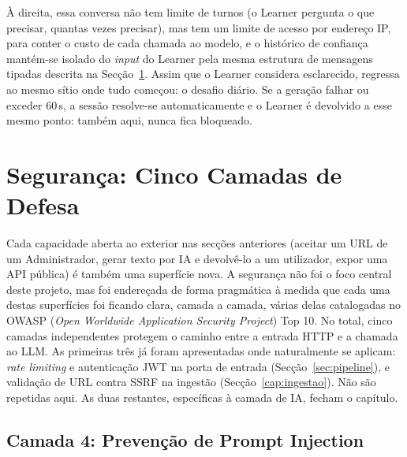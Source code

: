 À direita, essa conversa não tem limite de turnos (o Learner pergunta o que precisar, quantas vezes precisar), mas tem um limite de acesso por endereço IP, para conter o custo de cada chamada ao modelo, e o histórico de confiança mantém-se isolado do \textit{input} do Learner pela mesma estrutura de mensagens tipadas descrita na Secção~\ref{sec:seguranca-impl}. Assim que o Learner considera esclarecido, regressa ao mesmo sítio onde tudo começou: o desafio diário. Se a geração falhar ou exceder 60\,s, a sessão resolve-se automaticamente e o Learner é devolvido a esse mesmo ponto: também aqui, nunca fica bloqueado.

\section{Segurança: Cinco Camadas de Defesa} \label{sec:seguranca-impl} \label{cap:seguranca}

Cada capacidade aberta ao exterior nas secções anteriores (aceitar um URL de um Administrador, gerar texto por IA e devolvê-lo a um utilizador, expor uma API pública) é também uma superfície nova. A segurança não foi o foco central deste projeto, mas foi endereçada de forma pragmática à medida que cada uma destas superfícies foi ficando clara, camada a camada, várias delas catalogadas no OWASP (\textit{Open Worldwide Application Security Project}) Top 10. No total, cinco camadas independentes protegem o caminho entre a entrada HTTP e a chamada ao LLM. As primeiras três já foram apresentadas onde naturalmente se aplicam: \textit{rate limiting} e autenticação JWT na porta de entrada (Secção~\ref{sec:pipeline}), e validação de URL contra SSRF na ingestão (Secção~\ref{cap:ingestao}). Não são repetidas aqui. As duas restantes, específicas à camada de IA, fecham o capítulo.

\subsection*{Camada 4: Prevenção de Prompt Injection} \label{sec:protecao-ia}

